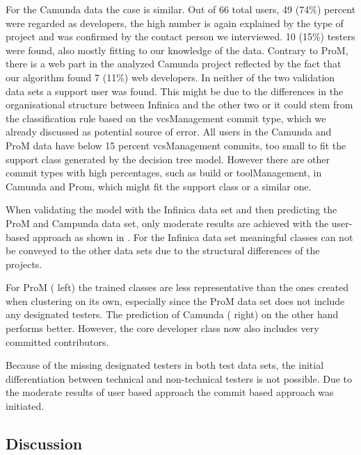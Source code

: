 For the Camunda data the case is similar. Out of 66 total users, 49 (74\%)
percent were regarded as developers, the high number is again explained by the
type of project and was confirmed by the contact person we interviewed. 10 (15\%)
testers were found, also mostly fitting to our knowledge of the data. Contrary
to ProM, there is a web part in the analyzed Camunda project reflected by the
fact that our algorithm found 7 (11\%) web developers. In neither of the two validation data sets a support user was found. This might be due to the differences in the organisational structure between Infinica and the other two or it could stem from the classification rule based on the vcsManagement commit type, which we already discussed as potential source of error. All users in the Camunda and ProM data have below 15 percent vcsManagement commits, too small to fit the support class generated by the decision tree model. However there are other commit types with high percentages, such as build or toolManagement, in Camunda and Prom, which might fit the support class or a similar one.

When validating the model with the Infinica data set and then predicting the ProM and Campunda data set, only moderate results are achieved with the user-based approach as shown in . For the Infinica data set meaningful classes can not be conveyed to the other data sets due to the structural differences of the projects.


For ProM ( left) the trained classes are less representative than the ones created when clustering on its own, especially since the ProM data set does not include any designated testers. The prediction of Camunda ( right) on the other hand performs better. However, the core developer class now also includes very committed contributors.

Because of the missing designated testers in both test data sets, the initial differentiation between technical and non-technical testers is not possible. Due to the moderate results of user based approach the commit based approach was initiated.




\subsection{Discussion}

